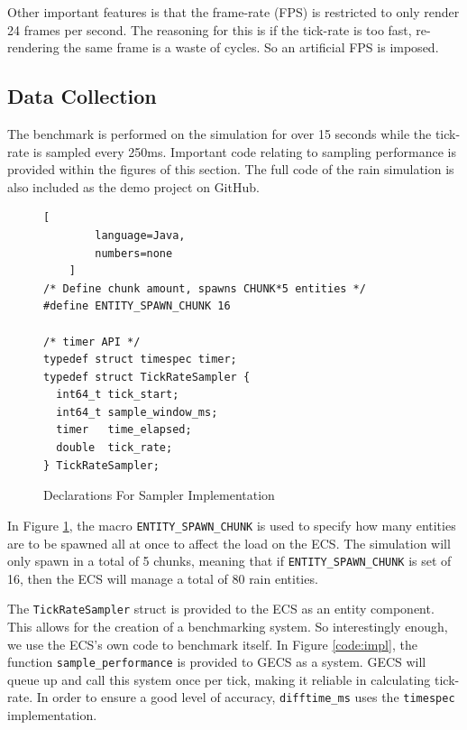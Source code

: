 Other important features is that the frame-rate (FPS) is restricted to only render 24 frames per second. The reasoning for this is if the tick-rate is too fast, re-rendering the same frame is a waste of cycles. So an artificial FPS is imposed.

\subsection{Data Collection}
The benchmark is performed on the simulation for over 15 seconds while the tick-rate is sampled every 250ms. Important code relating to sampling performance is provided within the figures of this section. The full code of the rain simulation is also included as the demo project on GitHub. 

\begin{figure}[htbp]
    \begin{lstlisting}[
        language=Java,
        numbers=none
    ]
/* Define chunk amount, spawns CHUNK*5 entities */
#define ENTITY_SPAWN_CHUNK 16

/* timer API */
typedef struct timespec timer;
typedef struct TickRateSampler {
  int64_t tick_start;
  int64_t sample_window_ms;
  timer   time_elapsed;
  double  tick_rate;
} TickRateSampler;
    \end{lstlisting}
    \caption{Declarations For Sampler Implementation}
    \label{code:sampler}
\end{figure}

In Figure \ref{code:sampler}, the macro \texttt{ENTITY\_SPAWN\_CHUNK} is used to specify how many entities are to be spawned all at once to affect the load on the ECS. The simulation will only spawn in a total of 5 chunks, meaning that if \texttt{ENTITY\_SPAWN\_CHUNK} is set of 16, then the ECS will manage a total of 80 rain entities. 

The \texttt{TickRateSampler} struct is provided to the ECS as an entity component. This allows for the creation of a benchmarking system. So interestingly enough, we use the ECS's own code to benchmark itself. In Figure \ref{code:impl}, the function \texttt{sample\_performance} is provided to GECS as a system. GECS will queue up and call this system once per tick, making it reliable in calculating tick-rate. In order to ensure a good level of accuracy, \texttt{difftime\_ms} uses the \texttt{timespec} implementation.

